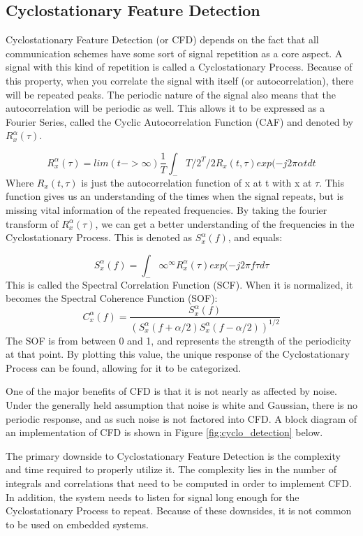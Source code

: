 \subsection{Cyclostationary Feature Detection}
Cyclostationary Feature Detection (or CFD) depends on the fact that all communication schemes have some sort of signal repetition as a core aspect. A signal with this kind of repetition is called a Cyclostationary Process. Because of this property, when you correlate the signal with itself (or autocorrelation), there will be repeated peaks. The periodic nature of the signal also means that the autocorrelation will be periodic as well. This allows it to be expressed as a Fourier Series, called the Cyclic Autocorrelation Function (CAF) and denoted by $R_x^\alpha(\tau)$.\par 
\[R_x^\alpha(\tau)=lim(t->\infty) \frac{1}{T} \int_-T/2^T/2 R_x(t,\tau)exp(-j2\pi\alpha t dt\]
Where $R_x(t,\tau)$ is just the autocorrelation function of x at t with x at $\tau$. This function gives us an understanding of the times when the signal repeats, but is missing vital information of the repeated frequencies. By taking the fourier transform of $R_x^\alpha(\tau)$, we can get a better understanding of the frequencies in the Cyclostationary Process. This is denoted as $S_x^\alpha(f)$, and equals: \par
\[ S_x^\alpha(f)=\int_-\infty^\infty R_x^\alpha(\tau)exp(-j2\pi f\tau d\tau \]
This is called the Spectral Correlation Function (SCF). When it is normalized, it becomes the Spectral Coherence Function (SOF):
\[C_x^\alpha(f) = \frac{ S_x^\alpha(f)}{ (S_x^\alpha(f+\alpha/2) S_x^\alpha(f-\alpha/2))^{1/2}} \]
The SOF is from between 0 and 1, and represents the strength of the periodicity at that point. By plotting this value, the unique response of the Cyclostationary Process can be found, allowing for it to be categorized. \par
One of the major benefits of CFD is that it is not nearly as affected by noise. Under the generally held assumption that noise is white and Gaussian, there is no periodic response, and as such noise is not factored into CFD. A block diagram of an implementation of CFD is shown in Figure \ref{fig:cyclo_detection} below. \par

The primary downside to Cyclostationary Feature Detection is the complexity and time required to properly utilize it. The complexity lies in the number of integrals and correlations that need to be computed in order to implement CFD. In addition, the system needs to listen for signal long enough for the Cyclostationary Process to repeat. Because of these downsides, it is not common to be used on embedded systems. \par


